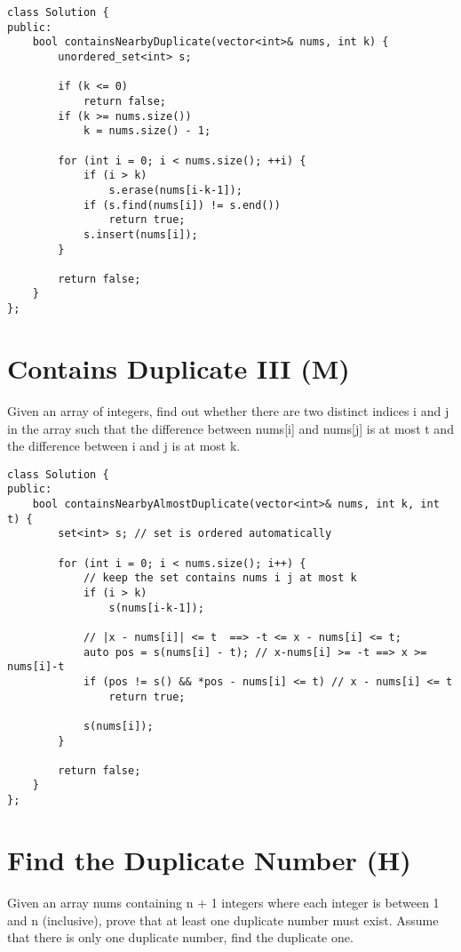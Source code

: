 \begin{lstlisting}
class Solution {
public:
    bool containsNearbyDuplicate(vector<int>& nums, int k) {
        unordered_set<int> s;
        
        if (k <= 0) 
            return false;
        if (k >= nums.size()) 
            k = nums.size() - 1;
       
        for (int i = 0; i < nums.size(); ++i) {
            if (i > k) 
                s.erase(nums[i-k-1]);
            if (s.find(nums[i]) != s.end())
                return true;
            s.insert(nums[i]);
        }
        
        return false;
    }
};
\end{lstlisting}


\section{Contains Duplicate III (M)}
Given an array of integers, find out whether there are two distinct indices i and j in the array such that the difference between nums[i] and nums[j] is at most t and the difference between i and j is at most k. \\

\begin{lstlisting}
class Solution {
public:
    bool containsNearbyAlmostDuplicate(vector<int>& nums, int k, int t) {
        set<int> s; // set is ordered automatically 
        
        for (int i = 0; i < nums.size(); i++) {
            // keep the set contains nums i j at most k
            if (i > k) 
                s(nums[i-k-1]); 
            
            // |x - nums[i]| <= t  ==> -t <= x - nums[i] <= t;
            auto pos = s(nums[i] - t); // x-nums[i] >= -t ==> x >= nums[i]-t 
            if (pos != s() && *pos - nums[i] <= t) // x - nums[i] <= t
                return true;
            
            s(nums[i]);
        }
        
        return false;
    }
};
\end{lstlisting}


\section{Find the Duplicate Number (H)}
Given an array nums containing n + 1 integers where each integer is between 1 and n (inclusive), prove that at least one duplicate number must exist. Assume that there is only one duplicate number, find the duplicate one. \\


